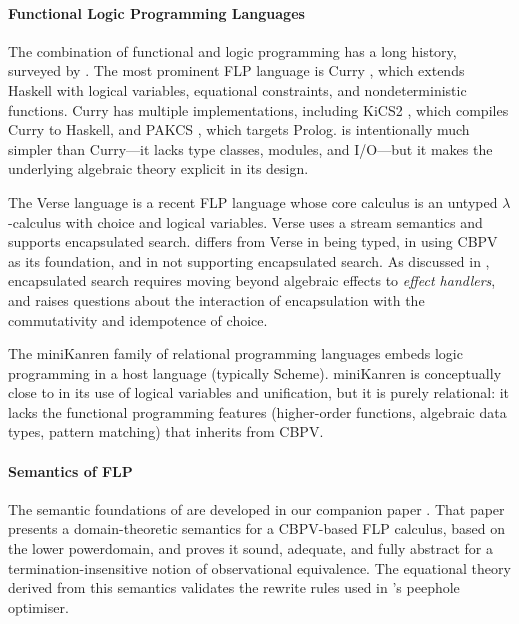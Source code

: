 \paragraph{Functional Logic Programming Languages}

The combination of functional and logic programming has a long history, surveyed
by
\textcite{bellia_1986,darlington_1986,hanus_1994,antoy_2010}. The most
prominent FLP language is Curry \parencite{hanus_2013,hanus_2016}, which extends
Haskell with logical variables, equational constraints, and nondeterministic
functions. Curry has multiple implementations, including KiCS2
\parencite{brassel_2011}, which compiles Curry to Haskell, and PAKCS
\parencite{hanus_2022}, which targets Prolog. \Gweek{} is intentionally much
simpler than Curry---it lacks type classes, modules, and I/O---but it makes the
underlying algebraic theory explicit in its design.

The Verse language \parencite{EpicGames_2023,augustsson_2023} is a recent FLP
language whose core calculus is an untyped $\lambda$-calculus with choice and
logical variables. Verse uses a stream semantics and supports encapsulated
search. \Gweek{} differs from Verse in being typed, in using CBPV as its
foundation, and in not supporting encapsulated search. As discussed in
\parencite{jones_2026}, encapsulated search requires moving beyond algebraic
effects to \emph{effect handlers}, and raises questions about the interaction of
encapsulation with the commutativity and idempotence of choice.

The miniKanren family of relational programming languages
\parencite{friedman_2005,friedman_2018,byrd_2009} embeds logic programming in a
host language (typically Scheme). miniKanren is conceptually close to \Gweek{} in
its use of logical variables and unification, but it is purely relational: it
lacks the functional programming features (higher-order functions, algebraic
data types, pattern matching) that \Gweek{} inherits from CBPV.

\paragraph{Semantics of FLP}

The semantic foundations of \Gweek{} are developed in our companion paper
\parencite{jones_2026}. That paper presents a domain-theoretic semantics for a
CBPV-based FLP calculus, based on the lower powerdomain, and proves it sound,
adequate, and fully abstract for a termination-insensitive notion of
observational equivalence. The equational theory derived from this semantics
validates the rewrite rules used in \Gweek{}'s peephole optimiser.

